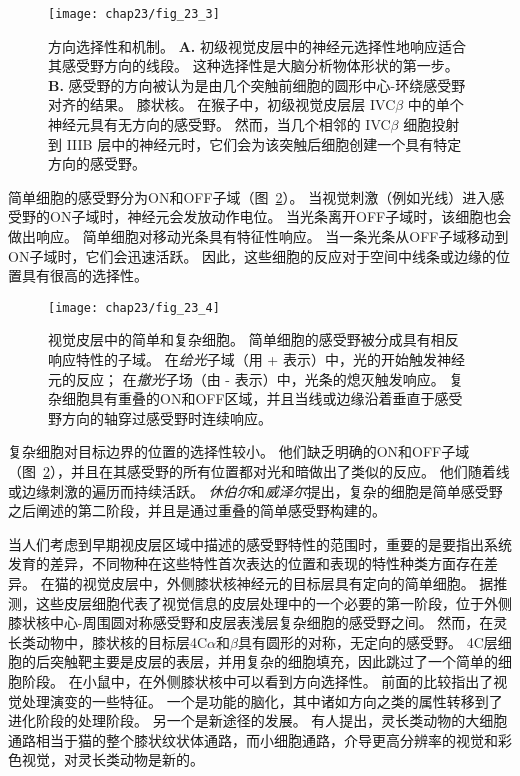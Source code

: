 \begin{figure}[htbp]
	\centering
	\texttt{[image: chap23/fig\_23\_3]}
	\caption{方向选择性和机制。
		\textbf{A.} 初级视觉皮层中的神经元选择性地响应适合其感受野方向的线段。
		这种选择性是大脑分析物体形状的第一步\cite{hubel1968receptive}。
		\textbf{B.} 感受野的方向被认为是由几个突触前细胞的圆形中心-环绕感受野对齐的结果。 
		膝状核。
		在猴子中，初级视觉皮层层 IVC$\beta$ 中的单个神经元具有无方向的感受野。
		然而，当几个相邻的 IVC$\beta$ 细胞投射到 IIIB 层中的神经元时，它们会为该突触后细胞创建一个具有特定方向的感受野。}
	\label{fig:23_3}
\end{figure}


简单细胞的感受野分为ON和OFF子域（图~\ref{fig:23_4}）。
当视觉刺激（例如光线）进入感受野的ON子域时，神经元会发放动作电位。
当光条离开OFF子域时，该细胞也会做出响应。
简单细胞对移动光条具有特征性响应。
当一条光条从OFF子域移动到ON子域时，它们会迅速活跃。
因此，这些细胞的反应对于空间中线条或边缘的位置具有很高的选择性。


\begin{figure}[htbp]
	\centering
	\texttt{[image: chap23/fig\_23\_4]}
	\caption{视觉皮层中的简单和复杂细胞。
		简单细胞的感受野被分成具有相反响应特性的子域。
		在\textit{给光}子域（用 + 表示）中，光的开始触发神经元的反应；
		在\textit{撤光}子场（由 - 表示）中，光条的熄灭触发响应。
		复杂细胞具有重叠的ON和OFF区域，并且当线或边缘沿着垂直于感受野方向的轴穿过感受野时连续响应。}
	\label{fig:23_4}
\end{figure}


复杂细胞对目标边界的位置的选择性较小。
他们缺乏明确的ON和OFF子域（图~\ref{fig:23_4}），并且在其感受野的所有位置都对光和暗做出了类似的反应。
他们随着线或边缘刺激的遍历而持续活跃。
\textit{休伯尔}和\textit{威泽尔}提出，复杂的细胞是简单感受野之后阐述的第二阶段，并且是通过重叠的简单感受野构建的。


当人们考虑到早期视皮层区域中描述的感受野特性的范围时，重要的是要指出系统发育的差异，不同物种在这些特性首次表达的位置和表现的特性种类方面存在差异。
在猫的视觉皮层中，外侧膝状核神经元的目标层具有定向的简单细胞。
据推测，这些皮层细胞代表了视觉信息的皮层处理中的一个必要的第一阶段，位于外侧膝状核中心-周围圆对称感受野和皮层表浅层复杂细胞的感受野之间。
然而，在灵长类动物中，膝状核的目标层4C$\alpha$和$\beta$具有圆形的对称，无定向的感受野。
4C层细胞的后突触靶主要是皮层的表层，并用复杂的细胞填充，因此跳过了一个简单的细胞阶段。
在小鼠中，在外侧膝状核中可以看到方向选择性。
前面的比较指出了视觉处理演变的一些特征。
一个是功能的脑化，其中诸如方向之类的属性转移到了进化阶段的处理阶段。
另一个是新途径的发展。
有人提出，灵长类动物的大细胞通路相当于猫的整个膝状纹状体通路，而小细胞通路，介导更高分辨率的视觉和彩色视觉，对灵长类动物是新的。


